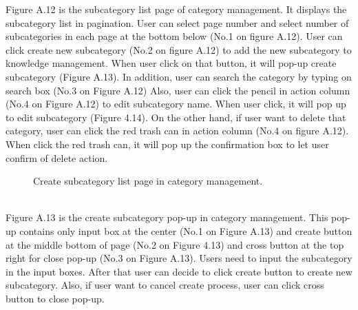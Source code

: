\documentclass[12pt,oneside,openright,a4paper]{cpe-english-project}
\begin{document}
Figure A.12 is the subcategory list page of category management. It displays the 
subcategory list in pagination. User can select page number and select number of 
subcategories in each page at the bottom below (No.1 on figure A.12).
User can click create new subcategory (No.2 on figure A.12) to add the new 
subcategory to knowledge management. When user click on that button, it will pop-up create 
subcategory (Figure A.13). In addition, user can search the category by typing on search box 
(No.3 on Figure A.12)
Also, user can click the pencil in action column (No.4 on Figure A.12) to edit 
subcategory name. When user click, it will pop up to edit subcategory (Figure 4.14). On the 
other hand, if user want to delete that category, user can click the red trash can in action 
column (No.4 on figure A.12). When click the red trash can, it will pop up the confirmation 
box to let user confirm of delete action. \\
\begin{figure}[!h]\centering
{}
\caption{Create subcategory list page in category management.
}\label{fig:Create subcategory list page in category management.
}
\end{figure} \\
Figure A.13 is the create subcategory pop-up in category management. This pop-up 
contains only input box at the center (No.1 on Figure A.13) and create button at the middle 
bottom of page (No.2 on Figure 4.13) and cross button at the top right for close pop-up (No.3 
on Figure A.13).
Users need to input the subcategory in the input boxes. After that user can decide to 
click create button to create new subcategory. Also, if user want to cancel create process, 
user can click cross button to close pop-up. \\
\end{document}
